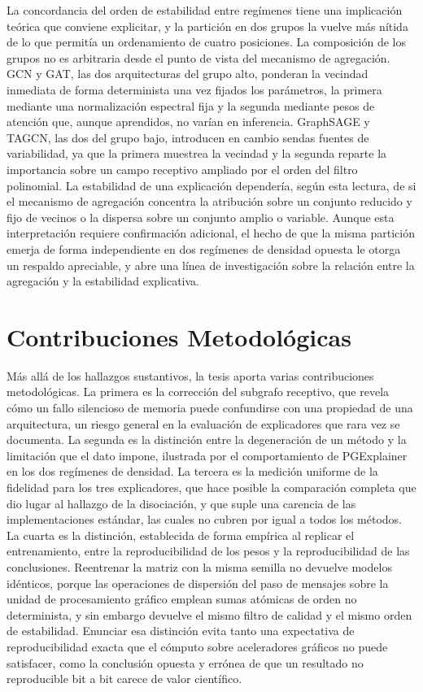 La concordancia del orden de estabilidad entre regímenes tiene una implicación teórica que conviene explicitar, y la partición en dos grupos la vuelve más nítida de lo que permitía un ordenamiento de cuatro posiciones. La composición de los grupos no es arbitraria desde el punto de vista del mecanismo de agregación. GCN y GAT, las dos arquitecturas del grupo alto, ponderan la vecindad inmediata de forma determinista una vez fijados los parámetros, la primera mediante una normalización espectral fija y la segunda mediante pesos de atención que, aunque aprendidos, no varían en inferencia. GraphSAGE y TAGCN, las dos del grupo bajo, introducen en cambio sendas fuentes de variabilidad, ya que la primera muestrea la vecindad y la segunda reparte la importancia sobre un campo receptivo ampliado por el orden del filtro polinomial. La estabilidad de una explicación dependería, según esta lectura, de si el mecanismo de agregación concentra la atribución sobre un conjunto reducido y fijo de vecinos o la dispersa sobre un conjunto amplio o variable. Aunque esta interpretación requiere confirmación adicional, el hecho de que la misma partición emerja de forma independiente en dos regímenes de densidad opuesta le otorga un respaldo apreciable, y abre una línea de investigación sobre la relación entre la agregación y la estabilidad explicativa.

\section{Contribuciones Metodológicas}

Más allá de los hallazgos sustantivos, la tesis aporta varias contribuciones metodológicas. La primera es la corrección del subgrafo receptivo, que revela cómo un fallo silencioso de memoria puede confundirse con una propiedad de una arquitectura, un riesgo general en la evaluación de explicadores que rara vez se documenta. La segunda es la distinción entre la degeneración de un método y la limitación que el dato impone, ilustrada por el comportamiento de PGExplainer en los dos regímenes de densidad. La tercera es la medición uniforme de la fidelidad para los tres explicadores, que hace posible la comparación completa que dio lugar al hallazgo de la disociación, y que suple una carencia de las implementaciones estándar, las cuales no cubren por igual a todos los métodos. La cuarta es la distinción, establecida de forma empírica al replicar el entrenamiento, entre la reproducibilidad de los pesos y la reproducibilidad de las conclusiones. Reentrenar la matriz con la misma semilla no devuelve modelos idénticos, porque las operaciones de dispersión del paso de mensajes sobre la unidad de procesamiento gráfico emplean sumas atómicas de orden no determinista, y sin embargo devuelve el mismo filtro de calidad y el mismo orden de estabilidad. Enunciar esa distinción evita tanto una expectativa de reproducibilidad exacta que el cómputo sobre aceleradores gráficos no puede satisfacer, como la conclusión opuesta y errónea de que un resultado no reproducible bit a bit carece de valor científico.


